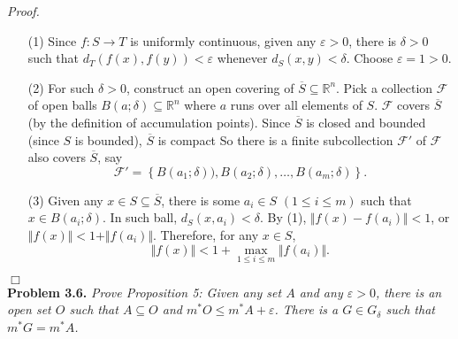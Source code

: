 \documentclass{article}
\begin{document}
\emph{Proof.}
\begin{enumerate}
\item[(1)]
  Since $f: S \rightarrow T$ is uniformly continuous,
  given any $\varepsilon > 0$, there is $\delta > 0$ such that
  $d_T(f(x), f(y)) < \varepsilon$ whenever $d_S(x, y) < \delta$.
  Choose $\varepsilon = 1 > 0$.

\item[(2)]
  For such $\delta > 0$, construct an open covering of $\overline{S} \subseteq \mathbb{R}^n$.
  Pick a collection $\mathscr{F}$ of open balls
  $B(a;\delta) \subseteq \mathbb{R}^n$
  where $a$ runs over all elements of $S$.
  $\mathscr{F}$ covers $\overline{S}$ (by the definition of accumulation points).
  Since $\overline{S} $ is closed and bounded (since $S$ is bounded),
  $\overline{S}$ is compact
  So there is a finite subcollection $\mathscr{F}'$ of $\mathscr{F}$
  also covers $\overline{S}$, say
  \[
    \mathscr{F}'
    = \left\{B(a_1;\delta)), B(a_2;\delta), \ldots, B(a_m;\delta) \right\}.
  \]

\item[(3)]
  Given any $x \in S \subseteq \overline{S}$,
  there is some $a_i \in S$ $(1 \leq i \leq m)$ such that $x \in B(a_i;\delta)$.
  In such ball, $d_S(x, a_i) < \delta$.
  By (1), $\Vert f(x) - f(a_i) \Vert < 1$,
  or $\Vert f(x) \Vert < 1 + \Vert f(a_i) \Vert$.
  Therefore, for any $x \in S$,
  \[
    \Vert f(x) \Vert < 1 + \max_{1 \leq i \leq m}{\Vert f(a_i) \Vert}.
  \]
\end{enumerate}
$\Box$ \\






\textbf{Problem 3.6.}
\emph{Prove Proposition 5:
Given any set $A$ and any $\varepsilon > 0$,
there is an open set $O$ such that $A \subseteq O$
and $m^{*}O \leq m^{*}A + \varepsilon$.
There is a $G \in G_{\delta}$ such that $m^{*}G = m^{*}A$.} \\
\end{document}
